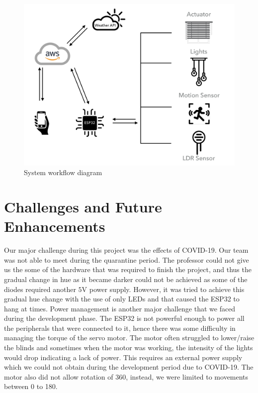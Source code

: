 \documentclass[conference]{IEEEtran}
\begin{document}
\begin{figure} [t]
	\centering
	\includegraphics[scale=0.18]{Workflow.png}
	\caption{System workflow diagram}
\end{figure}

\section{Challenges and Future Enhancements}

Our major challenge during this project was the effects of COVID-19. Our team was not able to meet during the quarantine period. The professor could not give us the some of the hardware that was required to finish the project, and thus the gradual change in hue as it became darker could not be achieved as some of the diodes required another $5$V power supply. However, it was tried to achieve this gradual hue change with the use of only LEDs and that caused the ESP32 to hang at times. 
Power management is another major challenge that we faced during the development phase. The ESP32 is not powerful enough to power all the peripherals that were connected to it, hence there was some difficulty in managing the torque of the servo motor. The motor often struggled to lower/raise the blinds and sometimes when the motor was working, the intensity of the lights would drop indicating a lack of power. This requires an external power supply which we could not obtain during the development period due to COVID-19. The motor also did not allow rotation of 360{\textdegree}, instead, we were limited to movements between 0{\textdegree} to 180{\textdegree}.
\end{document}
